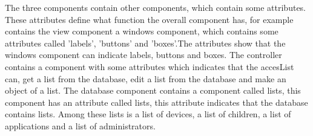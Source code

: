 The three components contain other components, which contain some attributes. These attributes define what function the overall component has, for example contains the view component a windows component, which contains some attributes called 'labels', 'buttons' and 'boxes'.The attributes show that the windows component can indicate labels, buttons and boxes.
The controller contains a component with some attributes which indicates that the accesList can, get a list from the database, edit a list from the database and make an object of a list.
The database component contains a component called lists, this component has an attribute called lists, this attribute indicates that the database contains lists. Among these lists is a list of devices, a list of children, a list of applications and a list of administrators.